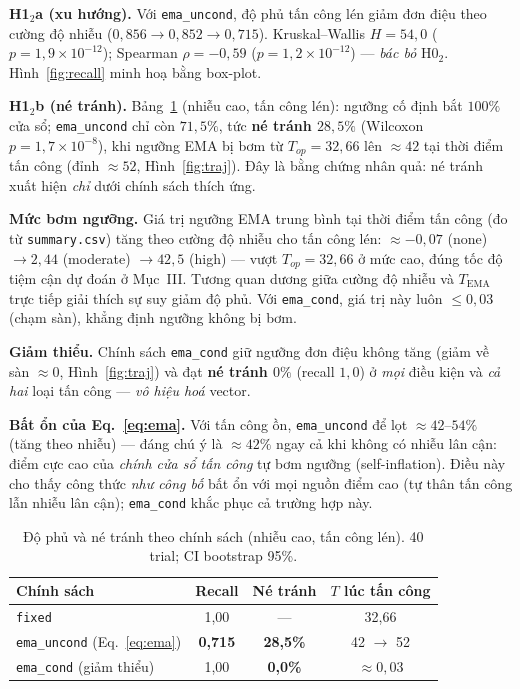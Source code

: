 \documentclass[conference,10pt]{IEEEtran}
\begin{document}
\textbf{H1$_2$a (xu hướng).} Với \texttt{ema\_uncond}, độ phủ tấn công lén giảm đơn điệu theo cường độ nhiễu ($0{,}856 \to 0{,}852 \to 0{,}715$). Kruskal--Wallis $H=54{,}0$ ($p=1{,}9\times10^{-12}$); Spearman $\rho=-0{,}59$ ($p=1{,}2\times10^{-12}$) — \textit{bác bỏ} H0$_2$. Hình~\ref{fig:recall} minh hoạ bằng box-plot.

\textbf{H1$_2$b (né tránh).} Bảng~\ref{tab:rq2} (nhiễu cao, tấn công lén): ngưỡng cố định bắt $100\%$ cửa sổ; \texttt{ema\_uncond} chỉ còn $71{,}5\%$, tức \textbf{né tránh $28{,}5\%$} (Wilcoxon $p=1{,}7\times10^{-8}$), khi ngưỡng EMA bị bơm từ $T_{op}=32{,}66$ lên $\approx42$ tại thời điểm tấn công (đỉnh $\approx52$, Hình~\ref{fig:traj}). Đây là bằng chứng nhân quả: né tránh xuất hiện \textit{chỉ} dưới chính sách thích ứng.

\textbf{Mức bơm ngưỡng.} Giá trị ngưỡng EMA trung bình tại thời điểm tấn công (đo từ \texttt{summary.csv}) tăng theo cường độ nhiễu cho tấn công lén: $\approx -0{,}07$ (none) $\to 2{,}44$ (moderate) $\to 42{,}5$ (high) — vượt $T_{op}=32{,}66$ ở mức cao, đúng tốc độ tiệm cận dự đoán ở Mục~III. Tương quan dương giữa cường độ nhiễu và $T_{\text{EMA}}$ trực tiếp giải thích sự suy giảm độ phủ. Với \texttt{ema\_cond}, giá trị này luôn $\le 0{,}03$ (chạm sàn), khẳng định ngưỡng không bị bơm.

\textbf{Giảm thiểu.} Chính sách \texttt{ema\_cond} giữ ngưỡng đơn điệu không tăng (giảm về sàn $\approx0$, Hình~\ref{fig:traj}) và đạt \textbf{né tránh $0\%$} (recall $1{,}0$) ở \textit{mọi} điều kiện và \textit{cả hai} loại tấn công — \textit{vô hiệu hoá} vector.

\textbf{Bất ổn của Eq.~\eqref{eq:ema}.} Với tấn công ồn, \texttt{ema\_uncond} để lọt $\approx 42$--$54\%$ (tăng theo nhiễu) — đáng chú ý là $\approx 42\%$ ngay cả khi không có nhiễu lân cận: điểm cực cao của \textit{chính cửa sổ tấn công} tự bơm ngưỡng (self-inflation). Điều này cho thấy công thức \textit{như công bố} bất ổn với mọi nguồn điểm cao (tự thân tấn công lẫn nhiễu lân cận); \texttt{ema\_cond} khắc phục cả trường hợp này.

\begin{table}[t]
\caption{Độ phủ và né tránh theo chính sách (nhiễu cao, tấn công lén). 40 trial; CI bootstrap 95\%.}
\label{tab:rq2}
\centering
\renewcommand{\arraystretch}{1.15}
\begin{tabular}{@{}lccc@{}}
\toprule
\textbf{Chính sách} & \textbf{Recall} & \textbf{Né tránh} & \textbf{$T$ lúc tấn công} \\
\midrule
\texttt{fixed} & 1{,}00 & --- & 32{,}66 \\
\texttt{ema\_uncond} (Eq.~\ref{eq:ema}) & \textbf{0{,}715} & \textbf{28{,}5\%} & 42 $\to$ 52 \\
\texttt{ema\_cond} (giảm thiểu) & 1{,}00 & \textbf{0{,}0\%} & $\approx0{,}03$ \\
\bottomrule
\end{tabular}
\end{table}
\end{document}
